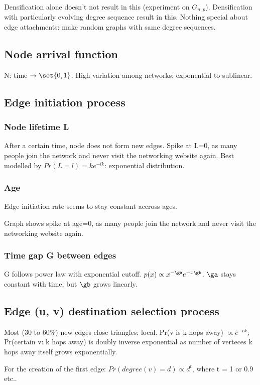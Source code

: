 \documentclass[oneside, article]{memoir}
\begin{document}
Densification alone doesn't not result in this (experiment on $G_{n,p}$). Densification with particularly evolving degree sequence result in this. Nothing special about edge attachments: make random graphs with same degree sequences. \cite{leskovecThesis}

\subsection{Node arrival function}
N: time $\to \set{0,1}$. High variation among networks: exponential to sublinear.

\subsection{Edge initiation process}
\subsubsection{Node lifetime L}
After a certain time, node does not form new edges. Spike at L=0, as many people join the network and never visit the networking website again. Best modelled by $Pr(L = l) = ke^{-lk}$: exponential distribution.

\subsubsection{Age}
Edge initiation rate seems to stay constant accross ages.

Graph shows spike at age=0, as many people join the network and never visit the networking website again.

\subsubsection{Time gap G between edges}
G follows power law with exponential cutoff. $p(x) \propto x^{-\ga}e^{-x\gb}$. $\ga$ stays constant with time, but $\gb$ grows linearly.

\subsection{Edge (u, v) destination selection process}
Most (30 to 60\%) new edges close triangles: local. Pr(v is k hops away) $\propto e^{-ck}$; Pr(certain v: k hops away) is doubly inverse exponential as number of verteces k hops away itself grows exponentially. \cite{leskovecThesis}

For the creation of the first edge: $Pr(degree(v) = d) \propto d^{t}$, where t = 1 or 0.9 etc..
\end{document}

